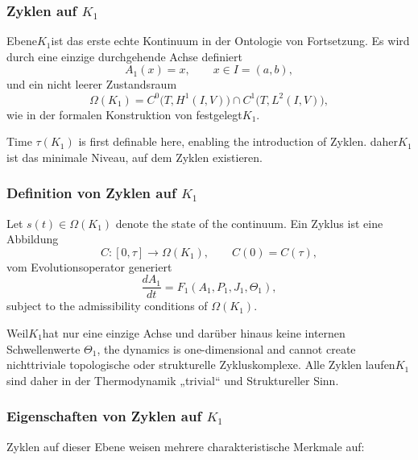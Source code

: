 
\subsubsection{Zyklen auf \texorpdfstring{$K_1$}{K_1}}
\label{sec:cycles-k1}

Ebene$K_1$ist das erste echte Kontinuum in der Ontologie von
Fortsetzung.
Es wird durch eine einzige durchgehende Achse definiert
\[
  A_1(x)=x, \qquad x\in I=(a,b),
\]
und ein nicht leerer Zustandsraum
\[
  \Omega(K_1)
  = C^0\!\bigl(T, H^1(I,V)\bigr)
    \cap C^1\!\bigl(T, L^2(I,V)\bigr),
\]
wie in der formalen Konstruktion von festgelegt$K_1$.

Time $\tau(K_1)$ is first definable here, enabling the introduction of
Zyklen.
daher$K_1$ist das minimale Niveau, auf dem Zyklen existieren.

\subsubsection{Definition von Zyklen auf \texorpdfstring{$K_1$}{K_1}}

Let $s(t)\in\Omega(K_1)$ denote the state of the continuum.
Ein Zyklus ist eine Abbildung
\[
  C:[0,\tau]\to\Omega(K_1), \qquad
  C(0)=C(\tau),
\]
vom Evolutionsoperator generiert
\[
  \frac{dA_1}{dt} = F_1(A_1,P_1,J_1,\Theta_1),
\]
subject to the admissibility conditions of $\Omega(K_1)$.

Weil$K_1$hat nur eine einzige Achse und darüber hinaus keine internen Schwellenwerte
$\Theta_1$, the dynamics is one-dimensional and cannot create
nichttriviale topologische oder strukturelle Zykluskomplexe.
Alle Zyklen laufen$K_1$sind daher in der Thermodynamik „trivial“ und
Struktureller Sinn.

\subsubsection{Eigenschaften von Zyklen auf \texorpdfstring{$K_1$}{K_1}}

Zyklen auf dieser Ebene weisen mehrere charakteristische Merkmale auf:

